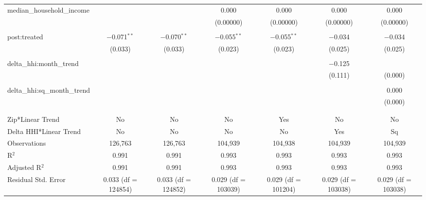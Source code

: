 \begin{table}[H]
{\begin{tabular}{@{\extracolsep{5pt}}lcccccc}
  median\_household\_income &  &  & 0.000 & 0.000 & 0.000 & 0.000 \\  

   &  &  & (0.00000) & (0.00000) & (0.00000) & (0.00000) \\  

   & & & & & & \\  

  post:treated & $-$0.071$^{**}$ & $-$0.070$^{**}$ & $-$0.055$^{**}$ & $-$0.055$^{**}$ & $-$0.034 & $-$0.034 \\  

   & (0.033) & (0.033) & (0.023) & (0.023) & (0.025) & (0.025) \\  

   & & & & & & \\  

  delta\_hhi:month\_trend &  &  &  &  & $-$0.125 &  \\  

   &  &  &  &  & (0.111) & (0.000) \\  

   & & & & & & \\  

  delta\_hhi:sq\_month\_trend &  &  &  &  &  & 0.000 \\  

   &  &  &  &  &  & (0.000) \\  

   & & & & & & \\  

 \hline \\[-1.8ex]  

 Zip*Linear Trend & No & No & No & Yes & No & No \\  

 Delta HHI*Linear Trend & No & No & No & No & Yes & Sq \\  

 Observations & 126,763 & 126,763 & 104,939 & 104,938 & 104,939 & 104,939 \\  

 R$^{2}$ & 0.991 & 0.991 & 0.993 & 0.993 & 0.993 & 0.993 \\  

 Adjusted R$^{2}$ & 0.991 & 0.991 & 0.993 & 0.993 & 0.993 & 0.993 \\  

 Residual Std. Error & 0.033 (df = 124854) & 0.033 (df = 124852) & 0.029 (df = 103039) & 0.029 (df = 101204) & 0.029 (df = 103038) & 0.029 (df = 103038) \\  


\end{tabular}}
\end{table}
